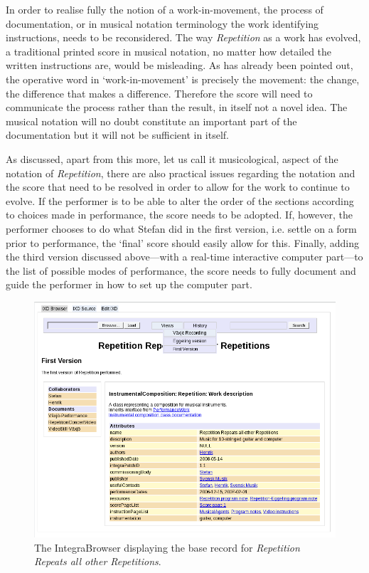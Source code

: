 In order to realise fully the notion of a work-in-movement, the process of documentation, or in musical notation terminology the work identifying instructions, needs to be reconsidered. The way \emph{Repetition} as a work has evolved, a traditional printed score in musical notation, no matter how detailed the written instructions are, would be misleading. As has already been pointed out, the operative word in `work-in-movement' is precisely the movement: the change, the difference that makes a difference. Therefore the score will need to communicate the process rather than the result, in itself not a novel idea. The musical notation will no doubt constitute an important part of the documentation but it will not be sufficient in itself.

As discussed, apart from this more, let us call it musicological, aspect of the notation of \emph{Repetition}, there are also practical issues regarding the notation and the score that need to be resolved in order to allow for the work to continue to evolve. If the performer is to be able to alter the order of the sections according to choices made in performance, the score needs to be adopted. If, however, the performer chooses to do what Stefan did in the first version, i.e. settle on a form prior to performance, the `final' score should easily allow for this. Finally, adding the third version discussed above---with a real-time interactive computer part---to the list of possible modes of performance, the score needs to fully document and guide the performer in how to set up the computer part. 
\begin{figure}[htb]
  \centering
  \includegraphics[width=\linewidth]{img/Work.png}
  \caption[The IntegraBrowser: base record.]{The IntegraBrowser displaying the base record for \emph{Repetition Repeats all other Repetitions}.}
  \label{fig:ib-1}
\end{figure}

